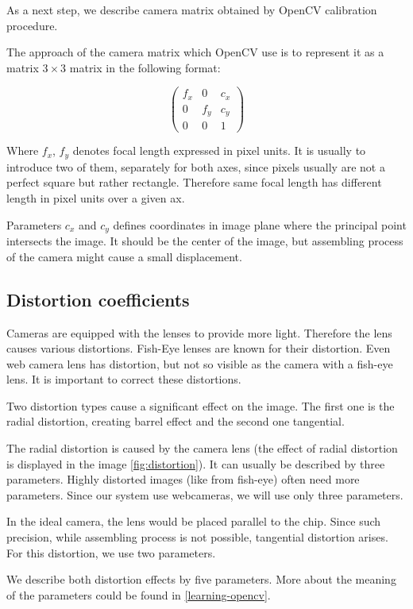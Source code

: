 As a next step, we describe camera matrix obtained by OpenCV calibration
procedure.

The approach of the camera matrix which OpenCV use is to represent it as a
matrix $3\times3$ matrix in the following format: 

\[
\begin{pmatrix}
	f_x 	& 0 	& c_x \\
	0	& f_y	& c_y \\
	0	& 0	& 1
\end{pmatrix}
\]

Where $f_x$, $f_y$ denotes focal length expressed in pixel units. It is usually
to introduce two of them, separately for both axes, since pixels usually are
not a perfect square but rather rectangle. Therefore same focal length has
different length in pixel units over a given ax.

Parameters $c_x$ and $c_y$ defines coordinates in image plane where the
principal point intersects the image. It should be the center of the image, but
assembling process of the camera might cause a small displacement.

\subsection{Distortion coefficients}

Cameras are equipped with the lenses to provide more light. Therefore the lens
causes various distortions. Fish-Eye lenses are known for their distortion.
Even web camera lens has distortion, but not so visible as the camera with a
fish-eye lens. It is important to correct these distortions.

Two distortion types cause a significant effect on the image. The first one is
the radial distortion, creating barrel effect and the second one tangential.

The radial distortion is caused by the camera lens (the effect of radial
distortion is displayed in the image \ref{fig:distortion}). It can usually be
described by three parameters. Highly distorted images (like from fish-eye)
often need more parameters. Since our system use webcameras, we will use only
three parameters.

In the ideal camera, the lens would be placed parallel to the chip. Since such
precision, while assembling process is not possible, tangential distortion
arises. For this distortion, we use two parameters.

We describe both distortion effects by five parameters. More about the meaning
of the parameters could be found in \ref{learning-opencv}.


